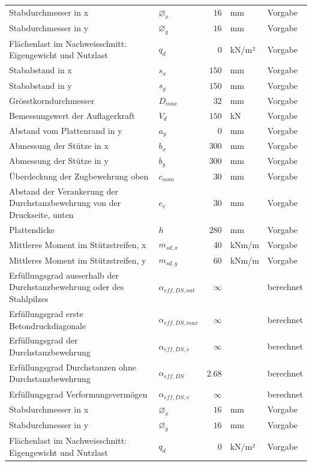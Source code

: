 \documentclass[11pt,a4paper]{article}
\begin{document}
\begin{xltabular}{\linewidth}{>{\raggedright\arraybackslash}Xlrll}
Stabdurchmesser in x & $\varnothing_x$ & $16$ & mm & Vorgabe \\
Stabdurchmesser in y & $\varnothing_y$ & $16$ & mm & Vorgabe \\
Flächenlast im Nachweisschnitt: Eigengewicht und Nutzlast & $q_d$ & $0$ & kN/m² & Vorgabe \\
Stababstand in x & $s_x$ & $150$ & mm & Vorgabe \\
Stababstand in y & $s_y$ & $150$ & mm & Vorgabe \\
Grösstkorndurchmesser & $D_{max}$ & $32$ & mm & Vorgabe \\
Bemessungswert der Auflagerkraft & $V_d$ & $150$ & kN & Vorgabe \\
Abstand vom Plattenrand in y & $a_y$ & $0$ & mm & Vorgabe \\
Abmessung der Stütze in x & $b_x$ & $300$ & mm & Vorgabe \\
Abmessung der Stütze in y & $b_y$ & $300$ & mm & Vorgabe \\
Überdeckung der Zugbewehrung oben & $c_{nom}$ & $30$ & mm & Vorgabe \\
Abstand der Verankerung der Durchstanzbewehrung von der Druckseite, unten & $c_v$ & $30$ & mm & Vorgabe \\
Plattendicke & $h$ & $280$ & mm & Vorgabe \\
Mittleres Moment im Stützstreifen, x & $m_{sd,x}$ & $40$ & kNm/m & Vorgabe \\
Mittleres Moment im Stützstreifen, y & $m_{sd,y}$ & $60$ & kNm/m & Vorgabe \\
Erfüllungsgrad ausserhalb der Durchstanzbewehrung oder des Stahlpilzes & $\alpha_{eff,DS,out}$ & $\infty$ &  & berechnet \\
Erfüllungsgrad erste Betondruckdiagonale & $\alpha_{eff,DS,max}$ & $\infty$ &  & berechnet \\
Erfüllungsgrad der Durchstanzbewehrung & $\alpha_{eff,DS,s}$ & $\infty$ &  & berechnet \\
Erfüllungsgrad Durchstanzen ohne Durchstanzbewehrung & $\alpha_{eff,DS}$ & $2.68$ &  & berechnet \\
Erfüllungsgrad Verformungsvermögen & $\alpha_{eff,DS,v}$ & $\infty$ &  & berechnet \\
Stabdurchmesser in x & $\varnothing_x$ & $16$ & mm & Vorgabe \\
Stabdurchmesser in y & $\varnothing_y$ & $16$ & mm & Vorgabe \\
Flächenlast im Nachweisschnitt: Eigengewicht und Nutzlast & $q_d$ & $0$ & kN/m² & Vorgabe \\

\end{xltabular}
\end{document}
